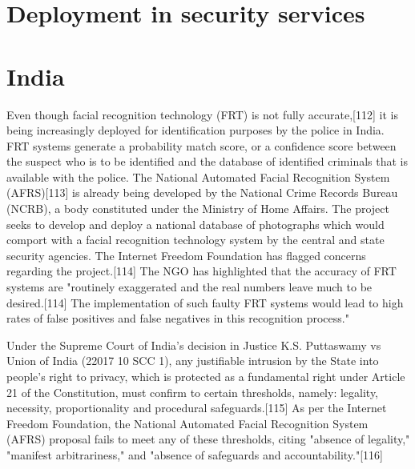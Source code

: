 \section{Deployment in security services}
\section{India}
Even though facial recognition technology (FRT) is not fully accurate,[112] it is being increasingly deployed for identification purposes by the police in India. FRT systems generate a probability match score, or a confidence score between the suspect who is to be identified and the database of identified criminals that is available with the police. The National Automated Facial Recognition System (AFRS)[113] is already being developed by the National Crime Records Bureau (NCRB), a body constituted under the Ministry of Home Affairs. The project seeks to develop and deploy a national database of photographs which would comport with a facial recognition technology system by the central and state security agencies. The Internet Freedom Foundation has flagged concerns regarding the project.[114] The NGO has highlighted that the accuracy of FRT systems are "routinely exaggerated and the real numbers leave much to be desired.[114] The implementation of such faulty FRT systems would lead to high rates of false positives and false negatives in this recognition process." 

Under the Supreme Court of India's decision in Justice K.S. Puttaswamy vs Union of India (22017 10 SCC 1), any justifiable intrusion by the State into people's right to privacy, which is protected as a fundamental right under Article 21 of the Constitution, must confirm to certain thresholds, namely: legality, necessity, proportionality and procedural safeguards.[115] As per the Internet Freedom Foundation, the National Automated Facial Recognition System (AFRS) proposal fails to meet any of these thresholds, citing "absence of legality," "manifest arbitrariness," and "absence of safeguards and accountability."[116]

